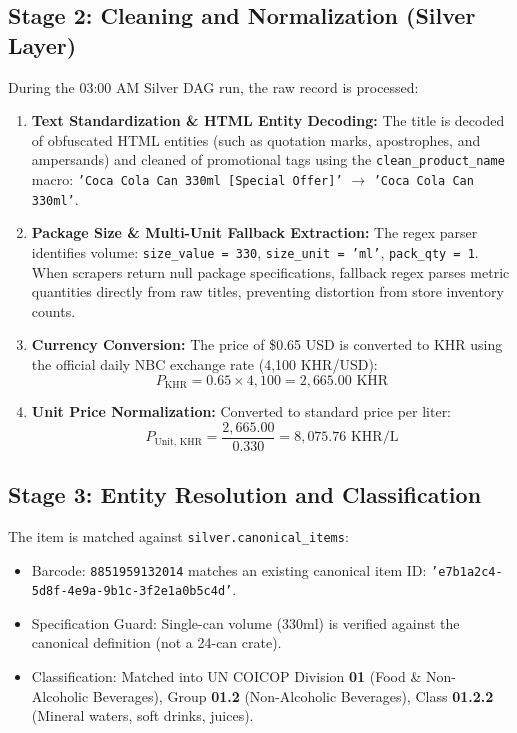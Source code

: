 \documentclass[11pt,a4paper,oneside]{article}
\begin{document}
\subsection{Stage 2: Cleaning and Normalization (Silver Layer)}
During the 03:00 AM Silver DAG run, the raw record is processed:
\begin{enumerate}
    \item \textbf{Text Standardization \& HTML Entity Decoding:} The title is decoded of obfuscated HTML entities (such as quotation marks, apostrophes, and ampersands) and cleaned of promotional tags using the \texttt{clean\_product\_name} macro: \texttt{'Coca Cola Can 330ml [Special Offer]'} $\rightarrow$ \texttt{'Coca Cola Can 330ml'}.
    \item \textbf{Package Size \& Multi-Unit Fallback Extraction:} The regex parser identifies volume: \texttt{size\_value = 330}, \texttt{size\_unit = 'ml'}, \texttt{pack\_qty = 1}. When scrapers return null package specifications, fallback regex parses metric quantities directly from raw titles, preventing distortion from store inventory counts.
    \item \textbf{Currency Conversion:} The price of \$0.65 USD is converted to KHR using the official daily NBC exchange rate (4,100 KHR/USD):
    \begin{equation}
    P_{\text{KHR}} = 0.65 \times 4,100 = 2,665.00 \text{ KHR}
    \end{equation}
    \item \textbf{Unit Price Normalization:} Converted to standard price per liter:
    \begin{equation}
    P_{\text{Unit, KHR}} = \frac{2,665.00}{0.330} = 8,075.76 \text{ KHR/L}
    \end{equation}
\end{enumerate}

\subsection{Stage 3: Entity Resolution and Classification}
The item is matched against \texttt{silver.canonical\_items}:
\begin{itemize}[noitemsep]
    \item Barcode: \texttt{8851959132014} matches an existing canonical item ID: \texttt{'e7b1a2c4-5d8f-4e9a-9b1c-3f2e1a0b5c4d'}.
    \item Specification Guard: Single-can volume (330ml) is verified against the canonical definition (not a 24-can crate).
    \item Classification: Matched into UN COICOP Division \textbf{01} (Food \& Non-Alcoholic Beverages), Group \textbf{01.2} (Non-Alcoholic Beverages), Class \textbf{01.2.2} (Mineral waters, soft drinks, juices).
\end{itemize}
\end{document}
